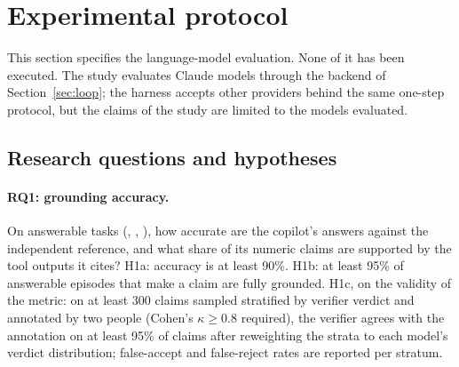 \section{Experimental protocol}
\label{sec:experiments}


This section specifies the language-model evaluation. None of it has been
executed.  The study evaluates Claude models
through the backend of Section~\ref{sec:loop}; the harness accepts other
providers behind the same one-step protocol, but the claims of the study are
limited to the models evaluated.

\subsection{Research questions and hypotheses}

\paragraph{RQ1: grounding accuracy.}
On answerable tasks (, , ), how
accurate are the copilot's answers against the independent reference, and
what share of its numeric claims are supported by the tool outputs it cites?
H1a: accuracy is at least 90\%. H1b: at least 95\% of answerable episodes that
make a claim are fully grounded. H1c, on the validity of the metric: on at
least 300 claims sampled stratified by verifier verdict and annotated by two
people (Cohen's $\kappa \ge 0.8$ required), the verifier agrees with the
annotation on at least 95\% of claims after reweighting the strata to each
model's verdict distribution; false-accept and false-reject rates are
reported per stratum.

